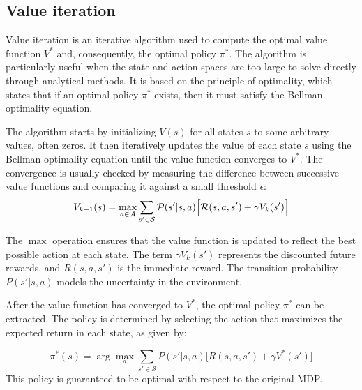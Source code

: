 \subsection{Value iteration}
Value iteration is an iterative algorithm used to compute the optimal value function \(V^*\) and, consequently, the optimal policy \(\pi^*\). 
 The algorithm is particularly useful when the state and action spaces are too large to solve directly through analytical methods. 
 It is based on the principle of optimality, which states that if an optimal policy \(\pi^*\) exists, then it must satisfy the Bellman optimality equation.

The algorithm starts by initializing \(V(s)\) for all states \(s\) to some arbitrary values, often zeros. 
 It then iteratively updates the value of each state \(s\) using the Bellman optimality equation until the value function converges to \(V^*\). 
 The convergence is usually checked by measuring the difference between successive value functions and comparing it against a small threshold \(\epsilon\):
\begin{equation}
V_{k+1}(s) = \max_{a \in \mathcal{A}} \sum_{s' \in \mathcal{S}} \mathcal{P}(s'|s, a) \Big[ \mathcal{R}(s, a, s') + \gamma V_k(s') \Big]
\end{equation}

The \(\max\) operation ensures that the value function is updated to reflect the best possible action at each state. 
 The term \(\gamma V_k(s')\) represents the discounted future rewards, and \(R(s, a, s')\) is the immediate reward. 
 The transition probability \(P(s'|s, a)\) models the uncertainty in the environment.

After the value function has converged to \(V^*\), the optimal policy \(\pi^*\) can be extracted. The policy is determined by selecting the action that maximizes the expected return in each state, as given by:

\begin{equation}
\pi^*(s) = \arg \max_{a} \sum_{s' \in \mathcal{S}} P(s'|s, a) \Big[ R(s, a, s') + \gamma V^*(s') \Big]
\end{equation}
This policy is guaranteed to be optimal with respect to the original MDP.


